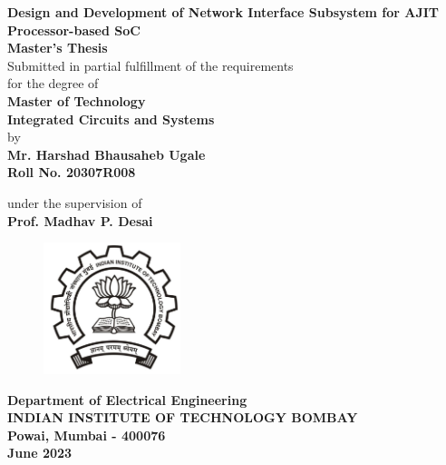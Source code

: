 \documentclass[12pt]{report}
\author{Harshad}
\begin{document}
\renewcommand{\arraystretch}{1.5}
\begin{center}
\Large
\textbf{Design and Development of Network Interface Subsystem for AJIT Processor-based SoC}\\
\bigskip
\bigskip
\bigskip
\large
\textbf{Master's Thesis}\\
\bigskip
\normalsize
\vspace*{0.5cm}
Submitted in partial fulfillment of the requirements
\\for the degree of\\
\vspace*{.8cm} \textbf{Master of Technology}\\
\textbf{Integrated Circuits and Systems}\\
\vspace*{0.5cm}
by\\
\vspace*{0.5cm}
\textbf{\large Mr. Harshad Bhausaheb Ugale} \\
\textbf{Roll No. 20307R008}\\


\vspace*{0.5cm}

under the supervision of\\
\textbf{Prof. Madhav P. Desai}\\
\vspace*{1cm}


\vspace*{0.5cm}
\begin{figure}[h!]
 \centering
 \includegraphics[width=4cm]{iitb_logo.jpg}
\end{figure}
\bigskip
\textbf{Department of Electrical Engineering}\\
\bigskip
\textbf{INDIAN INSTITUTE OF TECHNOLOGY BOMBAY}\\
\textbf{Powai, Mumbai - 400076}\\
\textbf{June 2023}\\
\end{center}
\thispagestyle{empty}
\end{document}
